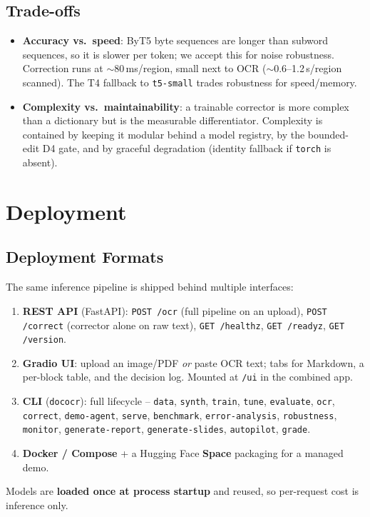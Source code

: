\documentclass[12pt,a4paper]{article}
\begin{document}
\subsection{Trade-offs}

\begin{itemize}\setlength\itemsep{0.15em}
  \item \textbf{Accuracy vs.\ speed}: ByT5 byte sequences are longer than subword sequences, so it is slower per token; we accept this for noise robustness. Correction runs at $\sim$80\,ms/region, small next to OCR ($\sim$0.6--1.2\,s/region scanned). The T4 fallback to \texttt{t5-small} trades robustness for speed/memory.
  \item \textbf{Complexity vs.\ maintainability}: a trainable corrector is more complex than a dictionary but is the measurable differentiator. Complexity is contained by keeping it modular behind a model registry, by the bounded-edit D4 gate, and by graceful degradation (identity fallback if \texttt{torch} is absent).
\end{itemize}

\section{Deployment}

\subsection{Deployment Formats}

The same inference pipeline is shipped behind multiple interfaces:
\begin{enumerate}
  \item \textbf{REST API} (FastAPI): \texttt{POST /ocr} (full pipeline on an upload), \texttt{POST /correct} (corrector alone on raw text), \texttt{GET /healthz}, \texttt{GET /readyz}, \texttt{GET /version}.
  \item \textbf{Gradio UI}: upload an image/PDF \emph{or} paste OCR text; tabs for Markdown, a per-block table, and the decision log. Mounted at \texttt{/ui} in the combined app.
  \item \textbf{CLI} (\texttt{dococr}): full lifecycle -- \texttt{data}, \texttt{synth}, \texttt{train}, \texttt{tune}, \texttt{evaluate}, \texttt{ocr}, \texttt{correct}, \texttt{demo-agent}, \texttt{serve}, \texttt{benchmark}, \texttt{error-analysis}, \texttt{robustness}, \texttt{monitor}, \texttt{generate-report}, \texttt{generate-slides}, \texttt{autopilot}, \texttt{grade}.
  \item \textbf{Docker / Compose} + a Hugging Face \textbf{Space} packaging for a managed demo.
\end{enumerate}
Models are \textbf{loaded once at process startup} and reused, so per-request cost is inference only.
\end{document}
